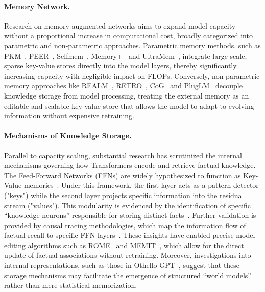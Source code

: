 \paragraph{Memory Network.}
Research on memory-augmented networks aims to expand model capacity without a proportional increase in computational cost, broadly categorized into parametric and non-parametric approaches. Parametric memory methods, such as PKM~\citep{lample2019large}, PEER~\citep{he2024mixture}, Selfmem~\citep{cheng2023lift}, Memory+~\citep{berges2024memory} and UltraMem~\citep{huang2024ultra,huang2025ultramemv2}, integrate large-scale, sparse key-value stores directly into the model layers, thereby significantly increasing capacity with negligible impact on FLOPs. 
Conversely, non-parametric memory approaches like REALM~\citep{guu2020retrieval}, RETRO~\citep{borgeaud2022improving,wang2023shall}, CoG~\citep{lan2023copy,caoretrieval} and PlugLM~\citep{cheng2023decouple} decouple knowledge storage from model processing, treating the external memory as an editable and scalable key-value store that allows the model to adapt to evolving information without expensive retraining.

\paragraph{Mechanisms of Knowledge Storage.}
Parallel to capacity scaling, substantial research has scrutinized the internal mechanisms governing how Transformers encode and retrieve factual knowledge. The Feed-Forward Networks (FFNs) are widely hypothesized to function as Key-Value memories~\citep{geva2021transformer}. Under this framework, the first layer acts as a pattern detector ("keys") while the second layer projects specific information into the residual stream ("values"). This modularity is evidenced by the identification of specific ``knowledge neurons'' responsible for storing distinct facts~\citep{dai2022knowledge}. Further validation is provided by causal tracing methodologies, which map the information flow of factual recall to specific FFN layers~\citep{meng2022locating}. These insights have enabled precise model editing algorithms such as ROME~\citep{meng2022locating} and MEMIT~\citep{meng2022mass}, which allow for the direct update of factual associations without retraining. Moreover, investigations into internal representations, such as those in Othello-GPT~\citep{li2024emergentworldrepresentationsexploring}, suggest that these storage mechanisms may facilitate the emergence of structured ``world models'' rather than mere statistical memorization.
